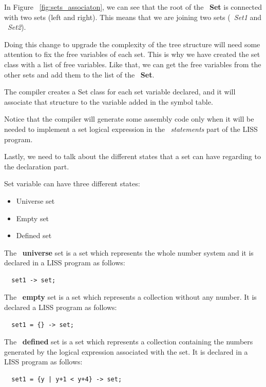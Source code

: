 \documentclass[
  oneside,
  11pt, a4paper,
  footinclude=true,
  headinclude=true,
  cleardoublepage=empty
]{scrbook}
\begin{document}
In Figure ~\ref{fig:sets_associaton}, we can see that the root of the ~\textbf{Set} is connected with two sets (left and right). This means that we are joining two sets (~\textit{Set1} and ~\textit{Set2}).

Doing this change to upgrade the complexity of the tree structure will need some attention to fix the free variables of each set. This is why we have created the set class with a list of free variables. Like that, we can get the free variables from the other sets and add them to the list of the ~\textbf{Set}.

The compiler creates a Set class for each set variable declared, and it will associate that structure to the variable added in the symbol table.

Notice that the compiler will generate some assembly code only when it will be needed to implement a set logical expression in the ~\textit{statements} part of the LISS program.

Lastly, we need to talk about the different states that a set can have regarding to the declaration part.

Set variable can have three different states:

\begin{itemize}
\item Universe set
\item Empty set
\item Defined set
\end{itemize}

The ~\textbf{universe} set is a set which represents the whole number system and it is declared in a LISS program as follows:

\begin{lstlisting}
  set1 -> set;
\end{lstlisting}

The ~\textbf{empty} set is a set which represents a collection without any number. It is declared a LISS program as follows:

\begin{lstlisting}
  set1 = {} -> set;
\end{lstlisting}

The ~\textbf{defined} set is a set which represents a collection containing the numbers generated by the logical expression associated with the set. It is declared in a LISS program as follows:

\begin{lstlisting}
  set1 = {y | y+1 < y+4} -> set;
\end{lstlisting}
\end{document}
